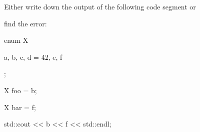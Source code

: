 Either write down the output of the following code segment or

find the error:



\begin{consolethree}[escapeinside=||]

enum X

{

    a, b, c, d = 42, e, f

};



X foo = b;

X bar = f;

std::cout << b << f << std::endl;

\end{consolethree}


